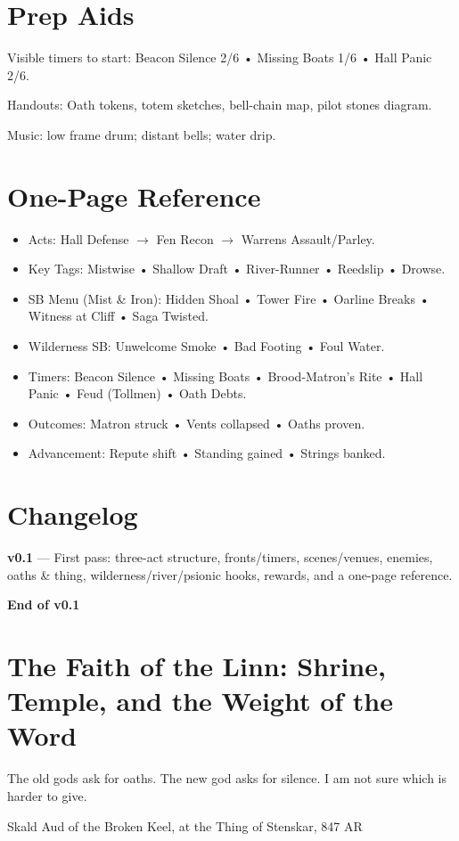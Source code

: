 \documentclass[11pt]{article}
\begin{document}
\section{Prep Aids}

Visible timers to start: Beacon Silence 2/6 • Missing Boats 1/6 • Hall Panic 2/6.

Handouts: Oath tokens, totem sketches, bell-chain map, pilot stones diagram.

Music: low frame drum; distant bells; water drip.

\section{One-Page Reference}
\begin{itemize}
\item Acts: Hall Defense $\rightarrow$ Fen Recon $\rightarrow$ Warrens Assault/Parley.
\item Key Tags: Mistwise • Shallow Draft • River-Runner • Reedslip • Drowse.
\item SB Menu (Mist \& Iron): Hidden Shoal • Tower Fire • Oarline Breaks • Witness at Cliff • Saga Twisted.
\item Wilderness SB: Unwelcome Smoke • Bad Footing • Foul Water.
\item Timers: Beacon Silence • Missing Boats • Brood-Matron's Rite • Hall Panic • Feud (Tollmen) • Oath Debts.
\item Outcomes: Matron struck • Vents collapsed • Oaths proven.
\item Advancement: Repute shift • Standing gained • Strings banked.
\end{itemize}

\section{Changelog}

\textbf{v0.1} --- First pass: three-act structure, fronts/timers, scenes/venues, enemies, oaths \& thing, wilderness/river/psionic hooks, rewards, and a one-page reference.

\textbf{End of v0.1}

\section{The Faith of the Linn: Shrine, Temple, and the Weight of the Word}

\epigraph{The old gods ask for oaths. The new god asks for silence. I am not sure which is harder to give.}{Skald Aud of the Broken Keel, at the Thing of Stenskar, 847 AR}
\end{document}
